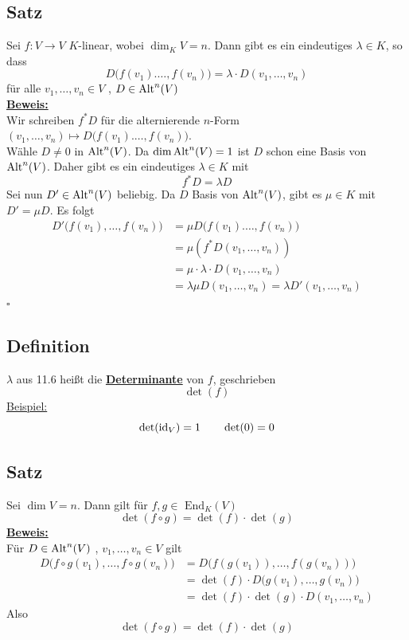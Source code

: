 \subsection{Satz} %
\label{sub:satz}
Sei $f: V \to V$ $K$-linear, wobei $\dim_K V = n$. Dann gibt es ein eindeutiges $\lambda \in K$, so dass
\[
	D \big(f(v_1). \ldots , f(v_n)\big) = \lambda \cdot D(v_1, \ldots , v_n)
\]
für alle $v_1, \ldots , v_n \in V$ , $D \in \operatorname{Alt}^n(V)$ 
\vspace{\baselineskip} \\
\underline{\textbf{Beweis:}} \\
Wir schreiben $f^*D$ für die alternierende $n$-Form $(v_1, \ldots , v_n) \mapsto D \big(f(v_1). \ldots , f(v_n)\big)$.
\vspace{10pt} \\
Wähle $D \not= 0$ in $\operatorname{Alt}^n(V)$. Da $\dim \operatorname{Alt}^n(V)=1$ ist $D$ schon eine Basis von $\operatorname{Alt}^n(V)$. Daher gibt es ein eindeutiges $\lambda \in K$ mit 
\[
	f^* D = \lambda D
\]
Sei nun $D' \in \operatorname{Alt}^n(V)$ beliebig. Da $D$ Basis von $\operatorname{Alt}^n(V)$, gibt es $\mu \in K$ mit $D'= \mu D$. Es folgt
\begin{align*}
	D' \big( f(v_1), \ldots , f(v_n)\big) &= \mu D \big(f(v_1). \ldots , f(v_n)\big)  \\
	&= \mu (f^* D (v_1, \ldots , v_n)) \\
	&= \mu \cdot \lambda \cdot D (v_1, \ldots , v_n) \\
	&= \lambda \mu D (v_1, \ldots , v_n) = \lambda D' (v_1, \ldots , v_n)
\end{align*}
\hfill \( \square \)

\subsection{Definition} %
\label{sub:definition}
$\lambda $ aus 11.6 heißt die \underline{\textbf{Determinante}} von $f$, geschrieben 
\[
	\det (f)
\]
\underline{Beispiel:} \\
\[
	\det (\operatorname{id}_V) = 1 \qquad \det (0)= 0
\]

\subsection{Satz} %
\label{sub:satz}
Sei $\dim V = n$. Dann gilt für $f,g  \in \text{ End}_K (V)$
\[
	  \det (f \circ g) = \det (f) \cdot \det (g)
\]
\underline{\textbf{Beweis:}} \\
Für $D \in \operatorname{Alt}^n(V)$ , $v_1, \ldots , v_n \in V$ gilt
\begin{align*}
	D \big(f \circ g (v_1), \ldots , f \circ g (v_n) \big) &= D \big(f ( g (v_1)), \ldots , f ( g (v_n)) \big) \\
	&= \det (f) \cdot D \big( g(v_1), \ldots , g(v_n) \big) \\
	&= \det(f) \cdot \det (g) \cdot D(v_1, \ldots , v_n)
\end{align*}
Also 
\[
	\det (f \circ g) = \det (f) \cdot \det (g)
\]

